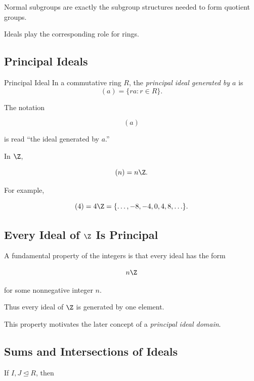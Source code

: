 Normal subgroups are exactly the subgroup structures needed to form quotient
groups.

Ideals play the corresponding role for rings.

\subsection{Principal Ideals}
\label{subsec:principal-ideals}

\begin{definitionbox}{Principal Ideal}
In a commutative ring \(R\), the \emph{principal ideal generated by \(a\)} is
\[ (a)=\{ra:r\in R\}. \]
\end{definitionbox}

The notation

\[ (a) \]

is read ``the ideal generated by \(a\).''

In \(\Z\),

\[ (n)=n\Z. \]

For example,

\[ (4)=4\Z=\{\ldots,-8,-4,0,4,8,\ldots\}. \]

\subsection{Every Ideal of \(\Z\) Is Principal}
\label{subsec:ideals-z-principal}

A fundamental property of the integers is that every ideal has the form

\[ n\Z \]

for some nonnegative integer \(n\).

Thus every ideal of \(\Z\) is generated by one element.

This property motivates the later concept of a \emph{principal ideal domain}.

\subsection{Sums and Intersections of Ideals}
\label{subsec:ideal-sums-intersections}

If \(I,J\trianglelefteq R\), then


